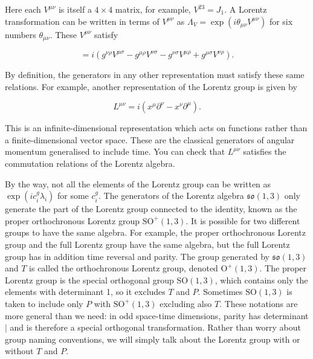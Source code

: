 \documentclass[11pt]{article}
\theoremstyle{definition}
\begin{document}
Here each \( V^{\mu \nu} \) is itself a \( 4 \times 4 \) matrix, for example, \( V^{23} = J_1 \). A Lorentz transformation can be written in terms of \( V^{\mu \nu} \) as \( \Lambda_V = \exp(i\theta_{\mu \nu} V^{\mu \nu}) \) for six numbers \( \theta_{\mu \nu} \). These \( V^{\mu \nu} \) satisfy

\begin{equation}
[V^{\mu \nu}, V^{\rho \sigma}] = i(g^{\nu \rho} V^{\mu \sigma} - g^{\mu \rho} V^{\nu \sigma} - g^{\nu \sigma} V^{\mu \rho} + g^{\mu \sigma} V^{\nu \rho}). 
\end{equation}

By definition, the generators in any other representation must satisfy these same relations. For example, another representation of the Lorentz group is given by

\begin{equation}
L^{\mu \nu} = i(x^{\mu} \partial^{\nu} - x^{\nu} \partial^{\mu}). 
\end{equation}

This is an infinite-dimensional representation which acts on functions rather than a finite-dimensional vector space. These are the classical generators of angular momentum generalised to include time. You can check that \( L^{\mu \nu} \) satisfies the commutation relations of the Lorentz algebra.

By the way, not all the elements of the Lorentz group can be written as \( \exp(i c_i^g \lambda_i) \) for some \( c_i^g \). The generators of the Lorentz algebra \(\mathfrak{so}(1, 3)\) only generate the part of the Lorentz group connected to the identity, known as the proper orthochronous Lorentz group \(\text{SO}^+(1, 3)\). It is possible for two different groups to have the same algebra. For example, the proper orthochronous Lorentz group and the full Lorentz group have the same algebra, but the full Lorentz group has in addition time reversal and parity. The group generated by \(\mathfrak{so}(1, 3)\) and \(T\) is called the orthochronous Lorentz group, denoted \(\text{O}^+(1, 3)\). The proper Lorentz group is the special orthogonal group \(\text{SO}(1, 3)\), which contains only the elements with determinant 1, so it excludes \(T\) and \(P\). Sometimes \(\text{SO}(1, 3)\) is taken to include only \(P\) with \(\text{SO}^+(1, 3)\) excluding also \(T\). These notations are more general than we need: in odd space-time dimensions, parity has determinant \(|\) and is therefore a special orthogonal transformation. Rather than worry about group naming conventions, we will simply talk about the Lorentz group with or without \(T\) and \(P\).
\end{document}
